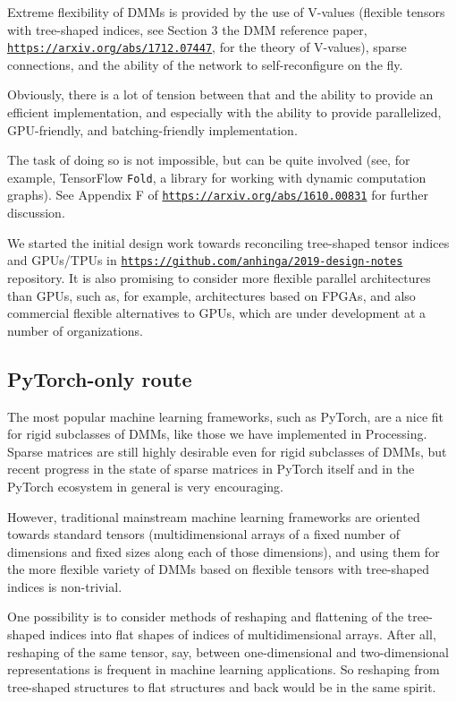 \documentclass{article}
\begin{document}
Extreme flexibility of DMMs is provided by the use of V-values (flexible tensors with tree-shaped indices, 
see Section 3 the DMM reference paper, \href{https://arxiv.org/abs/1712.07447}{\tt https://arxiv.org/abs/1712.07447}, for
the theory of V-values),
sparse connections, and the ability of the network to self-reconfigure on the fly.

Obviously, there is a lot of tension between that and the ability to provide an efficient implementation,
and especially with the ability to provide parallelized, GPU-friendly, and batching-friendly implementation.

The task of doing so is not impossible, but can be quite involved (see, for example, TensorFlow {\tt Fold},
a library for working with dynamic computation graphs). See Appendix F of \href{https://arxiv.org/abs/1610.00831}{\tt https://arxiv.org/abs/1610.00831} for further discussion.

We started the initial design work towards reconciling tree-shaped tensor indices and GPUs/TPUs in
\href{https://github.com/anhinga/2019-design-notes}{\tt https://github.com/anhinga/2019-design-notes}
repository. It is also promising to consider more flexible parallel architectures than GPUs, such
as, for example, architectures based on FPGAs, and also commercial flexible alternatives to GPUs,
which are under development at a number of organizations. 

\subsection{PyTorch-only route}

The most popular machine learning frameworks, such as PyTorch, are a nice fit for rigid subclasses
of DMMs, like those we have implemented in Processing. Sparse matrices are still highly desirable even for
rigid subclasses of DMMs, but recent progress in the state of sparse matrices in PyTorch itself and
in the PyTorch ecosystem in general is very encouraging.

However, traditional mainstream machine learning frameworks are oriented towards standard tensors (multidimensional arrays of a
fixed number of dimensions and fixed sizes along each of those dimensions), and using them for the more flexible variety of DMMs based on flexible tensors with tree-shaped indices is non-trivial.

One possibility is to consider methods of reshaping and flattening of the tree-shaped indices into
flat shapes of indices of multidimensional arrays. After all, reshaping of the same tensor, say, between
one-dimensional and two-dimensional representations is frequent in machine learning applications.
So reshaping from tree-shaped structures to flat structures and back would be in the same spirit.
\end{document}
